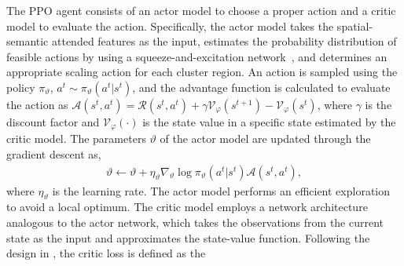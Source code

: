 \documentclass[letterpaper]{article} %
\newcommand\blue[1]{\textcolor{blue}{#1}}
\newcommand\rjf[1]{\textcolor{red}{\{RJF: #1\}}}
\newcommand\qz[1]{\textcolor{blue}{\{QZ: #1\}}}
\begin{document}
The PPO agent consists of an actor model to choose a proper action and a critic model to evaluate the action.
Specifically, the actor model takes the spatial-semantic attended features as the input, estimates the probability distribution of feasible actions by using a squeeze-and-excitation network~\cite{hu2018squeeze}, and determines an appropriate scaling action for each cluster region. An action is sampled using the policy $\pi_\vartheta$, $a^t \sim \pi_\vartheta (a^t | s^t)$, and the advantage function is calculated to evaluate the action as $\mathcal{A}(s^t, a^t)= \mathcal{R}(s^t, a^t)+%
\gamma \mathcal{V}_\varphi\left(s^{t+1}\right)-\mathcal{V}_\varphi\left(s^{t}\right)$,
where $\gamma$ is the discount factor and %
$\mathcal{V}_\varphi(\cdot)$ is the state value %
in a specific state estimated by the critic model. %
The parameters $\vartheta$ of the actor model are updated through the gradient descent as,
\begin{align}
\label{eqn:actor_gradient}
\vartheta \leftarrow \vartheta+\eta_{\vartheta} \nabla_{\vartheta} \log \pi_\vartheta (a^t | s^t)\mathcal{A}(s^t, a^t),
\end{align}
where $\eta_{\vartheta}$ is the learning rate. %
The actor model %
performs an efficient exploration to avoid a local optimum.
The critic model %
employs a network architecture analogous to the actor network, which takes the observations from the current state as the input and approximates the state-value function. Following the design in \cite{araslanov2019actor}, the critic loss is defined as the %
\end{document}
